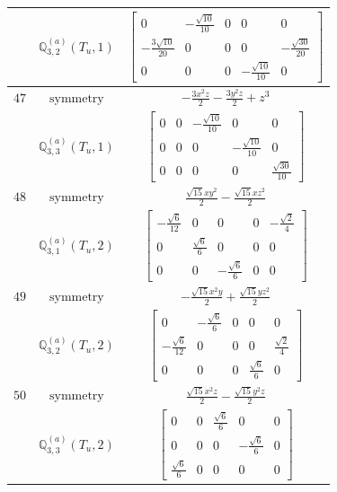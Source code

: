 \documentclass[fleqn,8pt,landscape]{jsarticle}
\begin{document}
\begin{longtable}{ccc}
$  $ & $ \mathbb{Q}_{3,2}^{(a)}(T_{u},1) $ & $ \begin{bmatrix} 0 & - \frac{\sqrt{10}}{10} & 0 & 0 & 0 \\ - \frac{3 \sqrt{10}}{20} & 0 & 0 & 0 & - \frac{\sqrt{30}}{20} \\ 0 & 0 & 0 & - \frac{\sqrt{10}}{10} & 0 \end{bmatrix} $ \\ \hline
$ 47 $ & $ \text{symmetry} $ & $ - \frac{3 x^{2} z}{2} - \frac{3 y^{2} z}{2} + z^{3} $ \\
$  $ & $ \mathbb{Q}_{3,3}^{(a)}(T_{u},1) $ & $ \begin{bmatrix} 0 & 0 & - \frac{\sqrt{10}}{10} & 0 & 0 \\ 0 & 0 & 0 & - \frac{\sqrt{10}}{10} & 0 \\ 0 & 0 & 0 & 0 & \frac{\sqrt{30}}{10} \end{bmatrix} $ \\ \hline
$ 48 $ & $ \text{symmetry} $ & $ \frac{\sqrt{15} x y^{2}}{2} - \frac{\sqrt{15} x z^{2}}{2} $ \\
$  $ & $ \mathbb{Q}_{3,1}^{(a)}(T_{u},2) $ & $ \begin{bmatrix} - \frac{\sqrt{6}}{12} & 0 & 0 & 0 & - \frac{\sqrt{2}}{4} \\ 0 & \frac{\sqrt{6}}{6} & 0 & 0 & 0 \\ 0 & 0 & - \frac{\sqrt{6}}{6} & 0 & 0 \end{bmatrix} $ \\ \hline
$ 49 $ & $ \text{symmetry} $ & $ - \frac{\sqrt{15} x^{2} y}{2} + \frac{\sqrt{15} y z^{2}}{2} $ \\
$  $ & $ \mathbb{Q}_{3,2}^{(a)}(T_{u},2) $ & $ \begin{bmatrix} 0 & - \frac{\sqrt{6}}{6} & 0 & 0 & 0 \\ - \frac{\sqrt{6}}{12} & 0 & 0 & 0 & \frac{\sqrt{2}}{4} \\ 0 & 0 & 0 & \frac{\sqrt{6}}{6} & 0 \end{bmatrix} $ \\ \hline
$ 50 $ & $ \text{symmetry} $ & $ \frac{\sqrt{15} x^{2} z}{2} - \frac{\sqrt{15} y^{2} z}{2} $ \\
$  $ & $ \mathbb{Q}_{3,3}^{(a)}(T_{u},2) $ & $ \begin{bmatrix} 0 & 0 & \frac{\sqrt{6}}{6} & 0 & 0 \\ 0 & 0 & 0 & - \frac{\sqrt{6}}{6} & 0 \\ \frac{\sqrt{6}}{6} & 0 & 0 & 0 & 0 \end{bmatrix} $ \\ \hline

\end{longtable}
\end{document}
